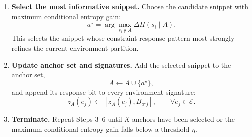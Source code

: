 \begin{enumerate}
    \item \textbf{Select the most informative snippet.}
    Choose the candidate snippet with maximum conditional entropy gain:
    \begin{equation}
        a^\star
        =
        \arg\max_{s_i\notin A}
        \Delta H(s_i\mid A).
    \end{equation}
    This selects the snippet whose constraint-response pattern most strongly refines the current environment partition.

    \item \textbf{Update anchor set and signatures.}
    Add the selected snippet to the anchor set,
    \begin{equation}
        A \leftarrow A\cup\{a^\star\},
    \end{equation}
    and append its response bit to every environment signature:
    \begin{equation}
        z_A(e_j)
        \leftarrow
        [z_A(e_j), B_{a^\star j}],
        \qquad \forall e_j\in\mathcal{E}.
    \end{equation}

    \item \textbf{Terminate.}
    Repeat Steps 3--6 until $K$ anchors have been selected or the maximum conditional entropy gain falls below a threshold $\eta$.
\end{enumerate}







